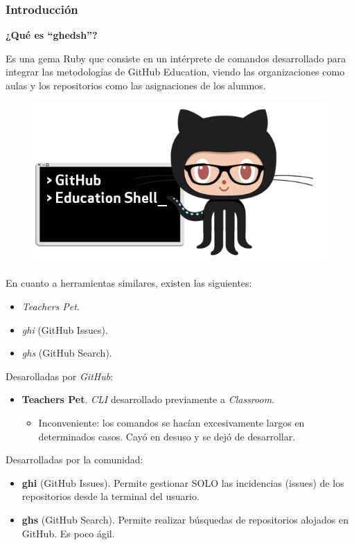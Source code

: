 \documentclass{beamer}
\begin{document}
\begin{frame}
  \frametitle{Introducción}
  \textbf{¿Qué es ``ghedsh''?}
  \bigskip

  Es una gema Ruby que consiste en un intérprete de comandos desarrollado para integrar las metodologías
  de GitHub Education, viendo las organizaciones como aulas y los repositorios como las asignaciones de los alumnos.
  
  \begin{center}
    \begin{figure}[!htb]  
        \includegraphics[width=\linewidth]{img/ghedsh-logo.png}
      \endminipage
    \end{figure}
  \end{center}

  \framebreak
  
  En cuanto a herramientas similares, existen las siguientes:
  \begin{itemize}
    \item {\it Teachers Pet}.
    \item {\it ghi} (GitHub Issues).
    \item {\it ghs} (GitHub Search).
  \end{itemize}

  \framebreak
  Desarolladas por {\it GitHub}:
  \begin{itemize}
    \item \textbf{Teachers Pet}. {\it CLI} desarrollado previamente a {\it Classroom}.
    \begin{itemize}
      \item Inconveniente: los comandos se hacían excesivamente largos en determinados casos. 
      Cayó en desuso y se dejó de desarrollar.
    \end{itemize}
  \end{itemize}

  Desarrolladas por la comunidad:
  \begin{itemize}
    \item \textbf{ghi} (GitHub Issues). Permite gestionar SOLO las incidencias (issues) de los repositorios desde la terminal del usuario.
    \item \textbf{ghs} (GitHub Search). Permite realizar búsquedas de repositorios alojados en GitHub. Es poco ágil.
  \end{itemize}
\end{frame}
\end{document}

